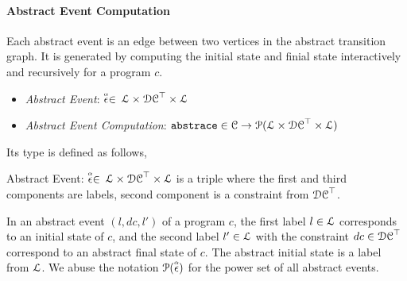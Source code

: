  \paragraph{Abstract Event Computation} Each abstract event is an edge between two vertices in the abstract transition graph.
 It is generated by computing the initial state and finial state interactively and recursively for a program $c$.
 
 \begin{itemize}
  \item \emph{Abstract Event}: 
  $\stackrel{\scriptscriptstyle{\alpha}}{\mathtt{\epsilon}{}} \in $
  $\mathcal{L} \times \mathcal{DC}^{\top} \times \mathcal{L}$
  \item \emph{Abstract Event Computation}: $\mathtt{abs}{\mathtt{trace}} \in \mathcal{C} \to \mathcal{P}( \mathcal{L} \times \mathcal{DC}^{\top} \times \mathcal{L} )$
 \end{itemize}
 Its type is defined as follows,
 \begin{defn}
   \label{def:abs_event}
   Abstract Event: 
   $\stackrel{\scriptscriptstyle{\alpha}}{\mathtt{\epsilon}{}} \in $
   $\mathcal{L} \times \mathcal{DC}^{\top} \times \mathcal{L}$
   is a 
   triple where the first and third components are labels,
   second component is a constraint from $\mathcal{DC}^{\top}$.
   \end{defn}
   In an abstract event $(l, dc, l')$ of a program $c$, 
   the first label $l \in \mathcal{L}$ corresponds to an initial state of $c$, and 
   the second label $l' \in \mathcal{L}$ with the constraint $dc \in \mathcal{DC}^{\top}$ correspond to an abstract final state of $c$.
  The abstract initial state is a label from $\mathcal{L}$.
We abuse the notation $\mathcal{P}(\stackrel{\scriptscriptstyle{\alpha}}{\mathtt{\epsilon}{}})$ for the power set of all abstract events.

